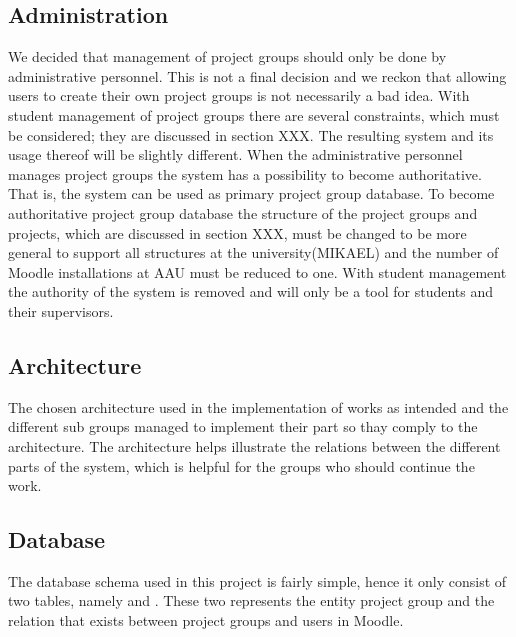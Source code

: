 \subsection{Administration}
We decided that management of project groups should only be done by administrative personnel. 
This is not a final decision and we reckon that allowing users to create their own project groups is not necessarily a bad idea. 
With student management of project groups there are several constraints, which must be considered; they are discussed in section XXX. 
The resulting system and its usage thereof will be slightly different.
When the administrative personnel manages project groups the system has a possibility to become authoritative.
That is, the system can be used as primary project group database. 
To become authoritative project group database the structure of the project groups and projects, which are discussed in section XXX, must be changed to be more general to support all structures at the university(MIKAEL) and the number of Moodle installations at AAU must be reduced to one. 
With student management the authority of the system is removed and will only be a tool for students and their supervisors.




\subsection{Architecture}
The chosen architecture used in the implementation of \system{} works as intended and the different sub groups managed to implement their part so thay comply to the architecture. 
The architecture helps illustrate the relations between the different parts of the system, which is helpful for the groups who should continue the work. 




\subsection{Database}
The database schema used in this project is fairly simple, hence it only consist of two tables, namely   and . 
These two represents the entity project group and the relation that exists between project groups and users in Moodle. 

